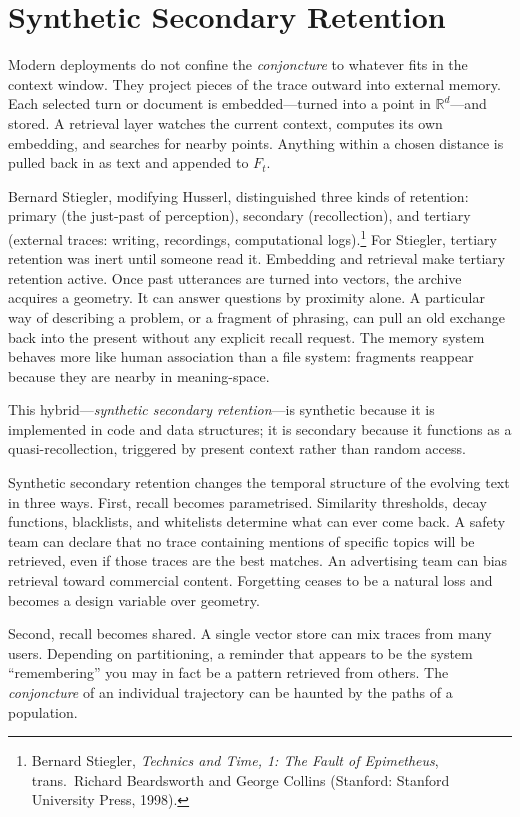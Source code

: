 \documentclass[12pt,a4paper]{article}
\begin{document}
\section{Synthetic Secondary Retention}

Modern deployments do not confine the \emph{conjoncture} to whatever fits in the context window. They project pieces of the trace outward into external memory. Each selected turn or document is embedded---turned into a point in $\mathbb{R}^d$---and stored. A retrieval layer watches the current context, computes its own embedding, and searches for nearby points. Anything within a chosen distance is pulled back in as text and appended to $F_t$.

Bernard Stiegler, modifying Husserl, distinguished three kinds of retention: primary (the just-past of perception), secondary (recollection), and tertiary (external traces: writing, recordings, computational logs).\footnote{Bernard Stiegler, \emph{Technics and Time, 1: The Fault of Epimetheus}, trans.\ Richard Beardsworth and George Collins (Stanford: Stanford University Press, 1998).} For Stiegler, tertiary retention was inert until someone read it. Embedding and retrieval make tertiary retention active. Once past utterances are turned into vectors, the archive acquires a geometry. It can answer questions by proximity alone. A particular way of describing a problem, or a fragment of phrasing, can pull an old exchange back into the present without any explicit recall request. The memory system behaves more like human association than a file system: fragments reappear because they are nearby in meaning-space.

This hybrid---\emph{synthetic secondary retention}---is synthetic because it is implemented in code and data structures; it is secondary because it functions as a quasi-recollection, triggered by present context rather than random access.

Synthetic secondary retention changes the temporal structure of the evolving text in three ways. First, recall becomes parametrised. Similarity thresholds, decay functions, blacklists, and whitelists determine what can ever come back. A safety team can declare that no trace containing mentions of specific topics will be retrieved, even if those traces are the best matches. An advertising team can bias retrieval toward commercial content. Forgetting ceases to be a natural loss and becomes a design variable over geometry.

Second, recall becomes shared. A single vector store can mix traces from many users. Depending on partitioning, a reminder that appears to be the system ``remembering'' you may in fact be a pattern retrieved from others. The \emph{conjoncture} of an individual trajectory can be haunted by the paths of a population.
\end{document}
